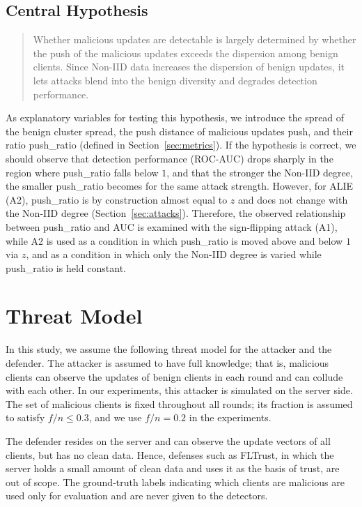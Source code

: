 \documentclass[a4paper,10pt]{article}
\newcommand{\PushRatio}{\textrm{push\_ratio}}
\newcommand{\Spread}{\textrm{spread}}
\newcommand{\Push}{\textrm{push}}
\begin{document}
\subsection{Central Hypothesis}

\begin{quote}
Whether malicious updates are detectable is largely determined by whether the push of the malicious updates exceeds the dispersion among benign clients. Since Non-IID data increases the dispersion of benign updates, it lets attacks blend into the benign diversity and degrades detection performance.
\end{quote}

As explanatory variables for testing this hypothesis, we introduce the spread of the benign cluster \Spread{}, the push distance of malicious updates \Push{}, and their ratio \PushRatio{} (defined in Section~\ref{sec:metrics}). If the hypothesis is correct, we should observe that detection performance (ROC-AUC) drops sharply in the region where \PushRatio{} falls below $1$, and that the stronger the Non-IID degree, the smaller \PushRatio{} becomes for the same attack strength. However, for ALIE (A2), \PushRatio{} is by construction almost equal to $z$ and does not change with the Non-IID degree (Section~\ref{sec:attacks}). Therefore, the observed relationship between \PushRatio{} and AUC is examined with the sign-flipping attack (A1), while A2 is used as a condition in which \PushRatio{} is moved above and below $1$ via $z$, and as a condition in which only the Non-IID degree is varied while \PushRatio{} is held constant.

\section{Threat Model}
\label{sec:threat}

In this study, we assume the following threat model for the attacker and the defender. The attacker is assumed to have full knowledge; that is, malicious clients can observe the updates of benign clients in each round and can collude with each other. In our experiments, this attacker is simulated on the server side. The set of malicious clients is fixed throughout all rounds; its fraction is assumed to satisfy $f/n \le 0.3$, and we use $f/n = 0.2$ in the experiments.

The defender resides on the server and can observe the update vectors of all clients, but has no clean data. Hence, defenses such as FLTrust\cite{cao2021fltrust}, in which the server holds a small amount of clean data and uses it as the basis of trust, are out of scope. The ground-truth labels indicating which clients are malicious are used only for evaluation and are never given to the detectors.
\end{document}
